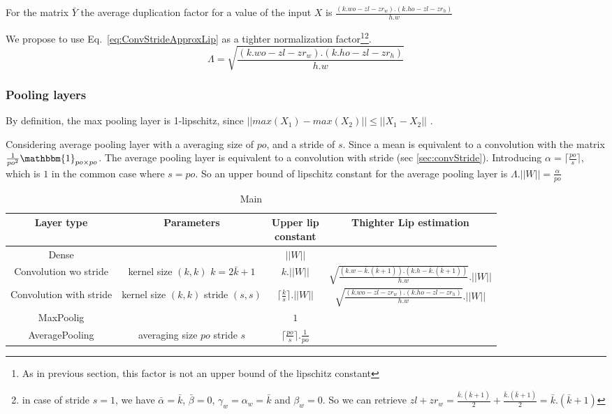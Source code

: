 For the matrix $\bar{Y}$ the average duplication factor for a value of the input $X$ is $\frac{(k.wo-zl-zr_w).(k.ho-zl-zr_h)}{h.w}$

We propose to use Eq.~\ref{eq:ConvStrideApproxLip} as a tighter normalization factor\footnote{As in previous section,  this factor is not an upper bound of the lipschitz constant}\footnote{in case of stride $s=1$, we have $\bar{\alpha} = \bar{k}$, $\bar{\beta} = 0$, $\gamma_w= \alpha_w=\bar{k}$ and $\beta_w=0$. So we can retrieve $zl+zr_w=\frac{\bar{k}.(\bar{k}+1)}{2} + \frac{\bar{k}.(\bar{k}+1)}{2}=\bar{k}.(\bar{k}+1)$ }.
\begin{equation}
\Lambda=\sqrt{\frac{(k.wo-zl-zr_w).(k.ho-zl-zr_h)}{h.w}} \label{eq:ConvStrideApproxLip}
\end{equation}


\subsubsection{Pooling layers}
By definition, the max pooling layer is 1-lipschitz, since $||max(X_1)-max(X_2)||\leq ||X_1-X_2||$ \cite{szegedy_intriguing_2013}.

Considering average pooling layer with a averaging size of $po$, and a stride of $s$. Since a mean is equivalent to a convolution with the matrix $\frac{1}{po^2}\mathbbm{1}_{po\times po}$.
The average pooling layer is equivalent to a convolution with stride (sec \ref{sec:convStride}). Introducing $\alpha=\lceil \frac{po}{s} \rceil$, which is $1$ in the common case where $s=po$. So an upper bound of lipschitz constant for  the average pooling layer is  $\Lambda.||W||=\frac{\alpha}{po}$

\begin{table}[]
    \centering
    \begin{tabular}{|c|c|c|c|}
    \hline
       Layer type  & Parameters &\shortstack{Upper lip  \\constant}   & Thighter Lip estimation \\ \hline
       Dense & & $||W||$ & \\ \hline
       Convolution wo stride& \shortstack{kernel size $(k,k)$\\ $k=2\bar{k}+1$} & $k.||W||$ & $\sqrt{\frac{(k.w-\bar{k}.(\bar{k}+1)).(k.h-\bar{k}.(\bar{k}+1))}{h.w}}.||W||$\\\hline
       Convolution with stride &  \shortstack{kernel size $(k,k)$\\ stride $(s,s)$} & $\lceil \frac{k}{s} \rceil.||W||$ & $\sqrt{\frac{(k.wo-zl-zr_w).(k.ho-zl-zr_h)}{h.w}}.||W||$\\\hline
       MaxPoolig & & $1$ & \\\hline
       AveragePooling & \shortstack{averaging size $po$\\ stride $s$} &$\lceil \frac{po}{s} \rceil.\frac{1}{po}$ & \\ \hline
    \end{tabular}
    \caption{Main }
    \label{tab:wasserstein_estimation}
\end{table}

